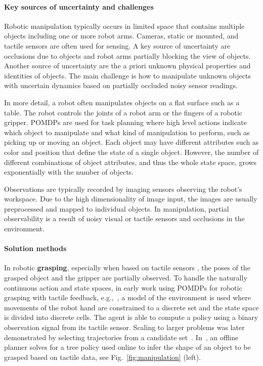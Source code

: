 \documentclass[journal]{IEEEtran}
\begin{document}
\paragraph{Key sources of uncertainty and challenges}
Robotic manipulation typically occurs in limited space that contains
multiple objects including one or more robot arms. {Cameras, static or mounted, and tactile sensors are often used for sensing.}
A key source of uncertainty are occlusions due to objects and robot arms partially blocking the view {of} objects. Another source of uncertainty are the a priori unknown physical properties and
identities of objects. The main challenge is how to manipulate
unknown objects with uncertain dynamics based on partially occluded
noisy sensor readings.

In more detail, a robot often manipulates objects on a flat surface
such as a table. The robot controls the joints of a robot arm or the
fingers of a robotic gripper.
%
%
POMDPs are used for task planning where high level actions indicate
which object to manipulate and what kind of manipulation to perform,
such as picking up or moving an object.
{Each object may have different attributes such as color and
  position that define the state of a single object. However, the
  number of different combinations of object attributes, and thus the
  whole state space, grows exponentially with the number of objects.}
%

Observations are typically recorded by imaging sensors
observing the robot's workspace. Due to the high dimensionality of
image input, the images are usually preprocessed and mapped to
individual objects. In manipulation, partial observability is a result
of noisy visual or tactile sensors and occlusions in the environment.


\paragraph{Solution methods}
In robotic \textbf{grasping}, especially when based on tactile sensors
\cite{hsiao2007grasping,koval2016pre,zhou2017probabilistic}, the poses of the grasped
object and the gripper are partially observed. To handle the naturally
continuous action and state spaces, in early work using
POMDPs for robotic grasping with tactile feedback, e.g.,~\cite{hsiao2007grasping}, a model of the environment is used where movements of the robot hand are constrained to a discrete set and
the state space is divided into discrete cells. {The agent is able to compute a policy using a binary
observation signal from its tactile sensor}.
{Scaling to larger problems was later demonstrated by selecting trajectories from a candidate set~\cite{hsiao2008robust}.}
In~\cite{zhou2017probabilistic}, an offline planner solves for a tree policy used online to infer the shape of an object to be grasped based on tactile data, see Fig.~\ref{fig:manipulation} (left).
\end{document}
